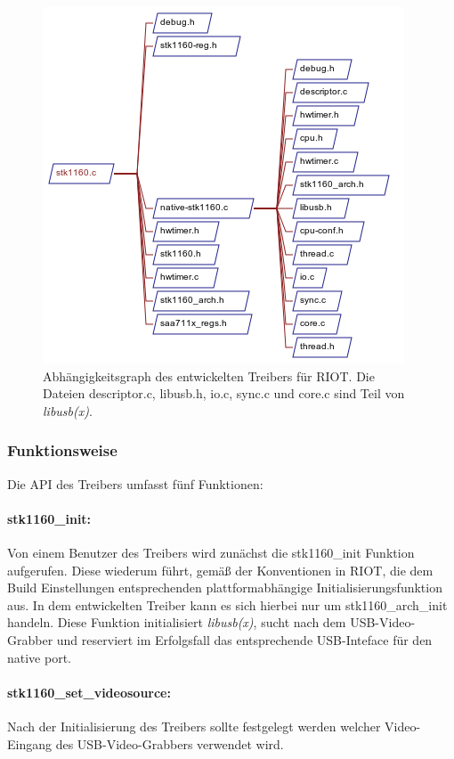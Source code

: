 \begin{figure}[htbp]
 \centering
 \includegraphics{./DependsOnGraph-stk1160-c.png}
 \caption{Abhängigkeitsgraph des entwickelten Treibers für RIOT. Die Dateien descriptor.c, libusb.h, io.c, sync.c und core.c sind Teil von \emph{libusb(x)}.}
 \label{fig:dependsgraph}
\end{figure}

\subsubsection{Funktionsweise}
Die API des Treibers umfasst fünf Funktionen:

\paragraph{stk1160\_init:}
Von einem Benutzer des Treibers wird zunächst die stk1160\_init Funktion aufgerufen. Diese wiederum führt, gemäß der Konventionen in RIOT, die dem Build Einstellungen entsprechenden plattformabhängige Initialisierungsfunktion aus. In dem entwickelten Treiber kann es sich hierbei nur um stk1160\_arch\_init handeln.
Diese Funktion initialisiert \emph{libusb(x)}, sucht nach dem USB-Video-Grabber und reserviert im Erfolgsfall das entsprechende USB-Inteface für den native port.

\paragraph{stk1160\_set\_videosource:} 
Nach der Initialisierung des Treibers sollte festgelegt werden welcher Video-Eingang des USB-Video-Grabbers verwendet wird. 

